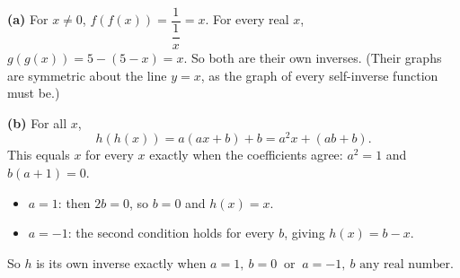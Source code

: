 \textbf{(a)} For $x\ne0$, $f(f(x))=\dfrac{1}{\dfrac{1}{x}}=x$. For every real $x$, $g(g(x))=5-(5-x)=x$. So both are their own inverses. (Their graphs are symmetric about the line $y=x$, as the graph of every self-inverse function must be.)

\textbf{(b)} For all $x$,
\[
h(h(x))=a(ax+b)+b=a^2x+(ab+b).
\]
This equals $x$ for every $x$ exactly when the coefficients agree: $a^2=1$ and $b(a+1)=0$.
\begin{itemize}
\item $a=1$: then $2b=0$, so $b=0$ and $h(x)=x$.
\item $a=-1$: the second condition holds for every $b$, giving $h(x)=b-x$.
\end{itemize}
So $h$ is its own inverse exactly when $\boxed{a=1,\ b=0\ \text{ or }\ a=-1,\ b\text{ any real number}}$.
